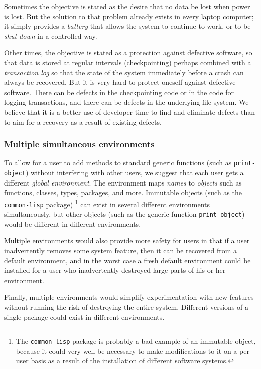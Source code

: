 Sometimes the objective is stated as the desire that no data be lost
when power is lost.  But the solution to that problem already exists
in every laptop computer; it simply provides a \emph{battery} that
allows the system to continue to work, or to be \emph{shut down} in a
controlled way. 

Other times, the objective is stated as a protection against
defective software, so that data is stored at regular intervals
(checkpointing) perhaps combined with a \emph{transaction log} so
that the state of the system immediately before a crash can always
be recovered.  But it is very hard to protect oneself against
defective software.  There can be defects in the checkpointing code
or in the code for logging transactions, and there can be defects in
the underlying file system.  We believe that it is a better use of
developer time to find and eliminate defects than to aim for a
recovery as a result of existing defects.

\subsubsection{Multiple simultaneous environments}

To allow for a user to add methods to standard generic functions (such
as \texttt{print-object}) without interfering with other users, we
suggest that each user gets a different \emph{global environment}.
The environment maps \emph{names} to \emph{objects} such as functions,
classes, types, packages, and more.  Immutable objects (such as the
\texttt{common-lisp} package)%
\footnote{The \texttt{common-lisp} package is probably a bad example
  of an immutable object, because it could very well be necessary to
  make modifications to it on a per-user basis as a result of the
  installation of different software systems.}
can exist in several different
environments simultaneously, but other objects (such as the generic
function \texttt{print-object}) would be different in different
environments.

Multiple environments would also provide more safety for users in
that if a user inadvertently removes some system feature, then it
can be recovered from a default environment, and in the worst case a
fresh default environment could be installed for a user who
inadvertently destroyed large parts of his or her environment. 

Finally, multiple environments would simplify experimentation with
new features without running the risk of destroying the entire
system.  Different versions of a single package could exist in
different environments.

